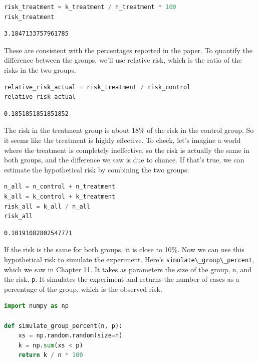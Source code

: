 \begin{lstlisting}[language=Python,style=source]
risk_treatment = k_treatment / n_treatment * 100
risk_treatment
\end{lstlisting}

\begin{lstlisting}[style=output]
3.1847133757961785
\end{lstlisting}

These are consistent with the percentages reported in the paper. To
quantify the difference between the groups, we'll use relative risk,
which is the ratio of the risks in the two groups.

\begin{lstlisting}[language=Python,style=source]
relative_risk_actual = risk_treatment / risk_control
relative_risk_actual
\end{lstlisting}

\begin{lstlisting}[style=output]
0.1851851851851852
\end{lstlisting}

The risk in the treatment group is about 18\% of the risk in the control
group. So it seems like the treatment is highly effective. To check,
let's imagine a world where the treatment is completely ineffective, so
the risk is actually the same in both groups, and the difference we saw
is due to chance. If that's true, we can estimate the hypothetical risk
by combining the two groups:

\begin{lstlisting}[language=Python,style=source]
n_all = n_control + n_treatment
k_all = k_control + k_treatment
risk_all = k_all / n_all
risk_all
\end{lstlisting}

\begin{lstlisting}[style=output]
0.10191082802547771
\end{lstlisting}

If the risk is the same for both groups, it is close to 10\%. Now we can
use this hypothetical risk to simulate the experiment. Here's
\passthrough{\lstinline!simulate\_group\_percent!}, which we saw in
Chapter 11. It takes as parameters the size of the group,
\passthrough{\lstinline!n!}, and the risk, \passthrough{\lstinline!p!}.
It simulates the experiment and returns the number of cases as a
percentage of the group, which is the observed risk.

\begin{lstlisting}[language=Python,style=source]
import numpy as np

def simulate_group_percent(n, p):
    xs = np.random.random(size=n)
    k = np.sum(xs < p)
    return k / n * 100
\end{lstlisting}

